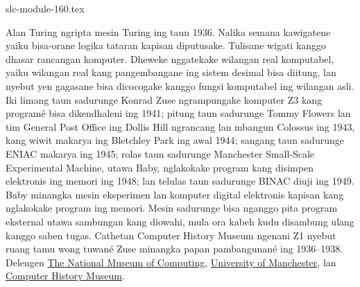 \begin{filecontents*}[overwrite]{slc-module-160.tex}
\begin{history}
Alan Turing ngripta mesin Turing ing taun 1936. Nalika semana kawigatene yaiku bisa-orane logika tataran kapisan diputusake. Tulisane wigati kanggo dhasar rancangan komputer. Dheweke nggatekake wilangan real komputabel, yaiku wilangan real kang pangembangane ing sistem desimal bisa diitung, lan nyebut yen gagasane bisa dicocogake kanggo fungsi komputabel ing wilangan asli.
Iki limang taun sadurunge Konrad Zuse ngrampungake komputer Z3 kang programé bisa dikendhaleni ing 1941; pitung taun sadurunge Tommy Flowers lan tim General Post Office ing Dollis Hill ngrancang lan mbangun Colossus ing 1943, kang wiwit makarya ing Bletchley Park ing awal 1944; sangang taun sadurunge ENIAC makarya ing 1945; rolas taun sadurunge Manchester Small-Scale Experimental Machine, utawa Baby, nglakokake program kang disimpen elektronis ing memori ing 1948; lan telulas taun sadurunge BINAC diuji ing 1949.
Baby minangka mesin eksperimen lan komputer digital elektronis kapisan kang nglakokake program ing memori. Mesin sadurunge bisa nganggo pita program eksternal utawa sambungan kang diowahi, mula ora kabeh kudu disambung ulang kanggo saben tugas. Cathetan Computer History Museum ngenani Z1 nyebut ruang tamu wong tuwané Zuse minangka papan pambangunané ing 1936--1938. Delengen \href{https://www.tnmoc.org/colossus}{The National Museum of Computing}, \href{https://www.manchester.ac.uk/about/news/university-celebrates-babys-65th-birthday/}{University of Manchester}, lan \href{https://www.computerhistory.org/revolution/birth-of-the-computer/4/84/336}{Computer History Museum}.
\end{history}


\end{filecontents*}


